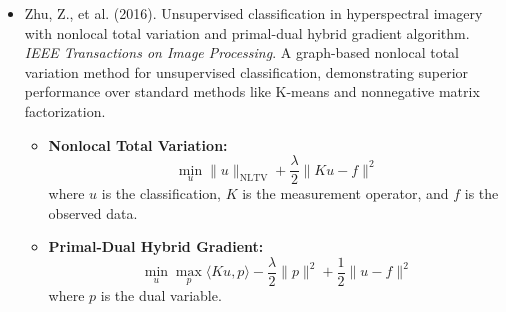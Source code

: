 \documentclass[10pt,svgnames,fragile]{beamer}
\begin{document}
\begin{frame}{}
\tiny
\begin{itemize}

\item Zhu, Z., et al. (2016). Unsupervised classification in hyperspectral imagery with nonlocal total variation and primal-dual hybrid gradient algorithm. \textit{IEEE Transactions on Image Processing}. \href{https://consensus.app/papers/unsupervised-classification-hyperspectral-imagery-with-zhu/af44fef016725a2bac8508ced2535018/?utm_source=chatgpt}{\color{blue}{DOI: 10.1109/TIP.2015.2481320}}
{\color{gray}A graph-based nonlocal total variation method for unsupervised classification, demonstrating superior performance over standard methods like K-means and nonnegative matrix factorization.}
\begin{itemize} \tiny
    \item \textbf{Nonlocal Total Variation:}
    \[
    \min_u \|u\|_{\text{NLTV}} + \frac{\lambda}{2} \|Ku - f\|^2
    \]
    where \(u\) is the classification, \(K\) is the measurement operator, and \(f\) is the observed data.
    \item \textbf{Primal-Dual Hybrid Gradient:}
    \[
    \min_u \max_p \langle Ku, p \rangle - \frac{\lambda}{2} \|p\|^2 + \frac{1}{2} \|u - f\|^2
    \]
    where \(p\) is the dual variable.
\end{itemize}

\end{itemize}
\end{frame}
\end{document}
